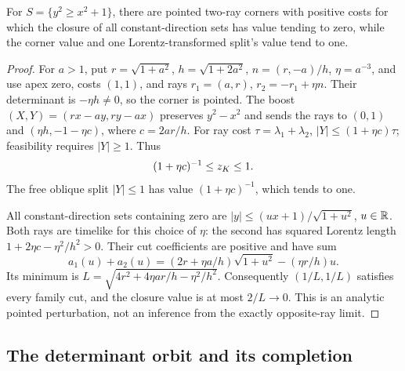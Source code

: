 \begin{proposition}
\label{fd:constant-family}
For $S=\{y^2\ge x^2+1\}$, there are pointed two-ray corners with
positive costs for which the closure of all constant-direction
sets has value tending to zero, while the corner value and one
Lorentz-transformed split's value tend to one.
\end{proposition}
\begin{proof}
For $a>1$, put $r=\sqrt{1+a^2}$, $h=\sqrt{1+2a^2}$,
$n=(r,-a)/h$, $\eta=a^{-3}$, and use apex zero, costs $(1,1)$,
and rays $r_1=(a,r)$, $r_2=-r_1+\eta n$.
Their determinant is $-\eta h\ne0$, so the corner is pointed.
The boost $(X,Y)=(rx-ay,ry-ax)$ preserves $y^2-x^2$ and sends
the rays to $(0,1)$ and $(\eta h,-1-\eta c)$, where $c=2ar/h$.
For ray cost $\tau=\lambda_1+\lambda_2$, $|Y|\le(1+\eta c)\tau$;
feasibility requires $|Y|\ge1$. Thus
\[
 (1+\eta c)^{-1}\le z_K\le1.
\]
The free oblique split $|Y|\le1$ has value $(1+\eta c)^{-1}$,
which tends to one.

All constant-direction sets containing zero are
$|y|\le(ux+1)/\sqrt{1+u^2}$, $u\in\mathbb R$.
Both rays are timelike for this choice of $\eta$:
the second has squared Lorentz length
$1+2\eta c-\eta^2/h^2>0$.
Their cut coefficients are positive and have sum
\[
 a_1(u)+a_2(u)
 =(2r+\eta a/h)\sqrt{1+u^2}-(\eta r/h)u.
\]
Its minimum is
$L=\sqrt{4r^2+4\eta ar/h-\eta^2/h^2}$.
Consequently $(1/L,1/L)$ satisfies every family cut, and the
closure value is at most $2/L\to0$. This is an analytic pointed
perturbation, not an inference from the exactly opposite-ray limit.
\end{proof}

\subsection{The determinant orbit and its completion}

